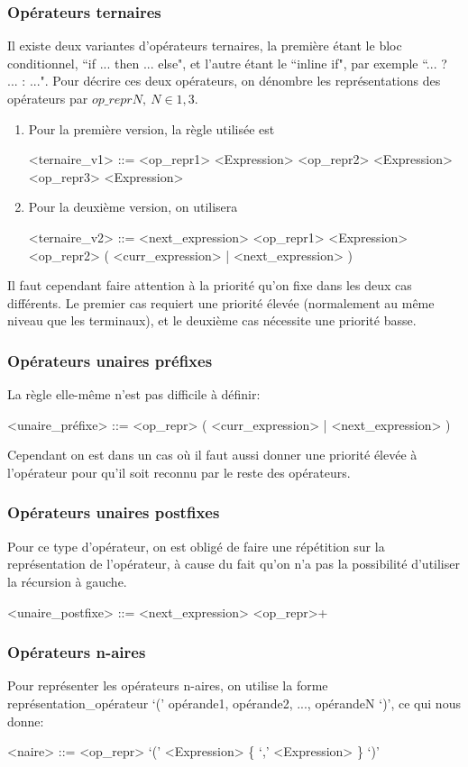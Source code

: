\documentclass{article}
\begin{document}
\subsubsection{Opérateurs ternaires}
Il existe deux variantes d'opérateurs ternaires, la première étant le bloc conditionnel, ``if ... then ... else", et l'autre étant le ``inline if", par exemple ``... ? ... : ...". Pour décrire ces deux opérateurs, on dénombre les représentations des opérateurs par $op\_reprN, \ N \in {1, 3}$.
\begin{enumerate}
	\item Pour la première version, la règle utilisée est 
	\begin{grammar}
		<ternaire\_v1> ::= <op\_repr1> <Expression> <op\_repr2> <Expression> <op\_repr3> <Expression>
	\end{grammar}
	\item Pour la deuxième version, on utilisera
	\begin{grammar}
		<ternaire\_v2> ::= <next\_expression> <op\_repr1> <Expression> <op\_repr2> ( <curr\_expression> | <next\_expression> )
	\end{grammar}
\end{enumerate}
Il faut cependant faire attention à la priorité qu'on fixe dans les deux cas différents. Le premier cas requiert une priorité élevée (normalement au même niveau que les terminaux), et le deuxième cas nécessite une priorité basse.
\subsubsection{Opérateurs unaires préfixes}
La règle elle-même n'est pas difficile à définir:
\begin{grammar}
	<unaire\_préfixe> ::= <op\_repr> ( <curr\_expression> | <next\_expression> )
\end{grammar}
Cependant on est dans un cas où il faut aussi donner une priorité élevée à l'opérateur pour qu'il soit reconnu par le reste des opérateurs.
\subsubsection{Opérateurs unaires postfixes}
Pour ce type d'opérateur, on est obligé de faire une répétition sur la représentation de l'opérateur, à cause du fait qu'on n'a pas la possibilité d'utiliser la récursion à gauche.
\begin{grammar}
	<unaire\_postfixe> ::= <next\_expression> <op\_repr>+
\end{grammar}
\subsubsection{Opérateurs n-aires}
Pour représenter les opérateurs n-aires, on utilise la forme représentation\_opérateur `(' opérande1, opérande2, ..., opérandeN `)', ce qui nous donne:
\begin{grammar}
	<naire> ::= <op\_repr> `(' <Expression> \{ `,' <Expression> \} `)'
\end{grammar}
\end{document}
